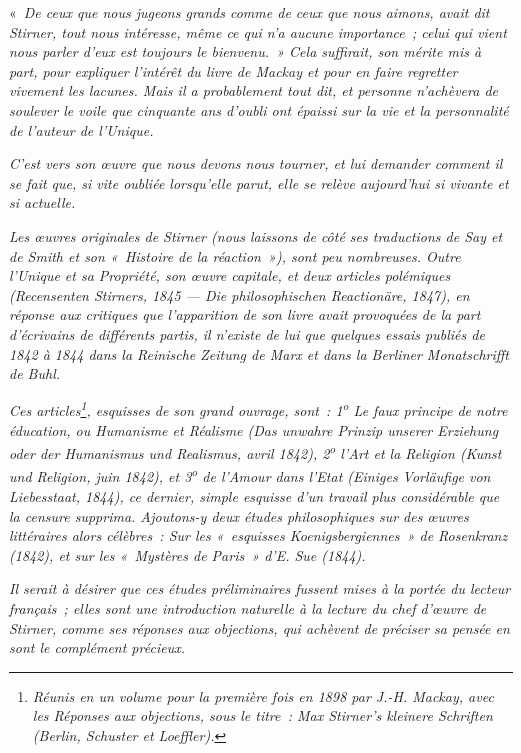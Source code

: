 \documentclass[french,twoside]{book} %
\begin{document}
\noindent « \emph{De ceux que nous jugeons grands comme de ceux que nous aimons, avait dit Stirner, tout nous intéresse, même ce qui n’a aucune importance ; celui qui vient nous parler d’eux est toujours le bienvenu. » Cela suffirait, son mérite mis à part, pour expliquer l’intérêt du livre de Mackay et pour en faire regretter vivement les lacunes. Mais il a probablement tout dit, et personne n’achèvera de soulever le voile que cinquante ans d’oubli ont épaissi sur la vie et la personnalité de l’auteur de l’\emph{Unique}.}\par
 \emph{C’est vers son œuvre que nous devons nous tourner, et lui demander comment il se fait que, si vite oubliée lorsqu’elle parut, elle se relève aujourd’hui si vivante et si actuelle.}\par
\emph{Les œuvres originales de Stirner (nous laissons de côté ses traductions de Say et de Smith et son « Histoire de la réaction »), sont peu nombreuses. Outre l’\emph{Unique et sa Propriété}, son œuvre capitale, et deux articles polémiques (\emph{Recensenten Stirners}, 1845 — \emph{Die philosophischen Reactionäre}, 1847), en réponse aux critiques que l’apparition de son livre avait provoquées de la part d’écrivains de différents partis, il n’existe de lui que quelques essais publiés de 1842 à 1844 dans la Reinische Zeitung de Marx et dans la Berliner Monatschrifft de Buhl.}\par
\emph{Ces articles\footnote{ \noindent \emph{Réunis en un volume pour la première fois en 1898 par J.-H. Mackay, avec les Réponses aux objections, sous le titre : \emph{Max Stirner’s kleinere Schriften} (Berlin, Schuster et Loeffler).}
 }, esquisses de son grand ouvrage, sont : 1\textsuperscript{o} Le faux principe de notre éducation, ou Humanisme et Réalisme (\emph{Das unwahre Prinzip unserer Erziehung oder der Humanismus und Realismus}, avril 1842), 2\textsuperscript{o} l’Art et la Religion (\emph{Kunst und Religion}, juin 1842), et 3\textsuperscript{o} de l’Amour dans l’Etat (\emph{Einiges Vorläufige von Liebesstaat}, 1844), ce dernier, simple esquisse d’un travail plus considérable que la censure supprima. Ajoutons-y deux études philosophiques sur des œuvres littéraires alors célèbres : Sur les « esquisses Koenigsbergiennes » de Rosenkranz (1842), et sur les « Mystères de Paris » d’E. Sue (1844).}\par
\emph{Il serait à désirer que ces études préliminaires fussent mises à la portée du lecteur français ; elles sont une introduction naturelle à la lecture du chef d’œuvre de Stirner, comme ses réponses aux objections, qui achèvent de préciser sa pensée en sont le complément précieux.}\par
\end{document}

